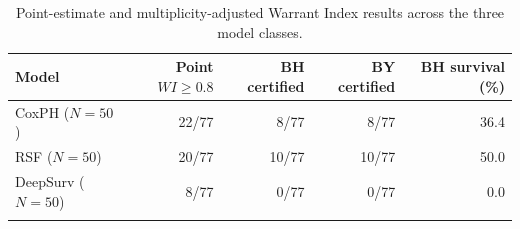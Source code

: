 \begin{table}[t]
\caption{Point-estimate and multiplicity-adjusted Warrant Index results across the three model classes.}
\label{tab:three-model-comparison}
\centering
\begin{tabular}{lrrrr}
\toprule
Model & Point $WI\geq0.8$ & BH certified & BY certified & BH survival (\%) \\
\midrule
CoxPH ($N=50$)    & 22/77 & 8/77  & 8/77  & 36.4 \\
RSF ($N=50$)      & 20/77 & 10/77 & 10/77 & 50.0 \\
DeepSurv ($N=50$) & 8/77  & 0/77  & 0/77  & 0.0 \\
\botrule
\end{tabular}
\end{table}
